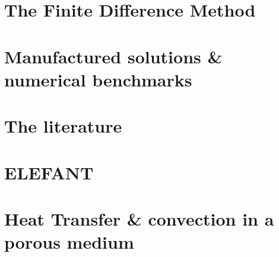 \documentclass[a4paper]{article}
\numberwithin{equation}{section}
\begin{document}
\newpage
\section{The Finite Difference Method} %


\newpage
\section{Manufactured solutions \& numerical benchmarks} %


\newpage
\section{The literature} %
 \label{app:topics}

\newpage
\section{ELEFANT} %
 \label{chapt:elefant}

\newpage
\section{Heat Transfer \& convection in a porous medium} %
 \label{chapt:porous}




\end{document}
